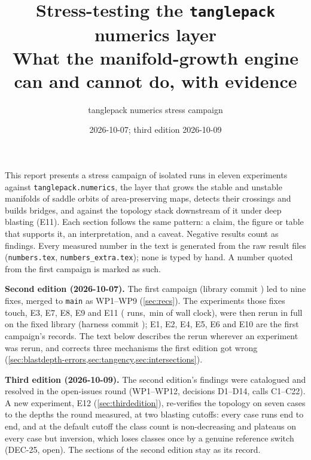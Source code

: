\documentclass[11pt,a4paper]{article}
\title{\textbf{Stress-testing the \texttt{tanglepack} numerics layer}\\[0.6em]
\large What the manifold-growth engine can and cannot do, with evidence}
\author{tanglepack numerics stress campaign}
\date{2026-10-07; third edition 2026-10-09}
\newcommand{\code}[1]{\texttt{#1}}
\begin{document}
\hypersetup{pageanchor=false}
\begin{titlepage}
\maketitle
\thispagestyle{empty}
\vfill
\begin{center}
\begin{minipage}{0.82\textwidth}
\small
\noindent This report presents a stress campaign of \NumConfigsTotal{}
isolated runs in eleven experiments against \code{tanglepack.numerics}, the
layer that grows the stable and unstable manifolds of saddle orbits of
area-preserving maps, detects their crossings and builds bridges, and against
the topology stack downstream of it under deep blasting (E11). Each section
follows the same pattern: a claim, the figure or table that supports it, an
interpretation, and a caveat. Negative results count as findings. Every
measured number in the text is generated from the raw result files
(\code{numbers.tex}, \code{numbers\_extra.tex}); none is typed by hand. A
number quoted from the first campaign is marked as such.

\medskip
\noindent\textbf{Second edition (2026-10-07).} The first campaign (library
commit \NumFirstCommit) led to nine fixes, merged to \code{main} as WP1--WP9
(\cref{sec:recs}). The experiments those fixes touch, E3, E7, E8, E9 and
E11 (\NumConfigsRerun{} runs, \NumRerunMin\,min of wall clock), were then
rerun in full on the fixed library (harness commit \NumRerunCommit); E1, E2,
E4, E5, E6 and E10 are the first campaign's records. The text below
describes the rerun wherever an experiment was rerun, and corrects three
mechanisms the first edition got wrong (\cref{sec:blastdepth-errors,sec:tangency,sec:intersections}).

\medskip
\noindent\textbf{Third edition (2026-10-09).} The second edition's findings
were catalogued and resolved in the open-issues round (WP1--WP12, decisions
D1--D14, calls C1--C22). A new experiment, E12
(\cref{sec:thirdedition}), re-verifies the topology on seven cases to the
depths the round measured, at two blasting cutoffs: every case runs end to
end, and at the default cutoff the class count is non-decreasing and
plateaus on every case but inversion, which loses classes once by a genuine
reference switch (DEC-25, open). The sections of the second edition stay as
its record.
\end{minipage}
\end{center}
\vfill
\end{titlepage}
\hypersetup{pageanchor=true}
\end{document}
